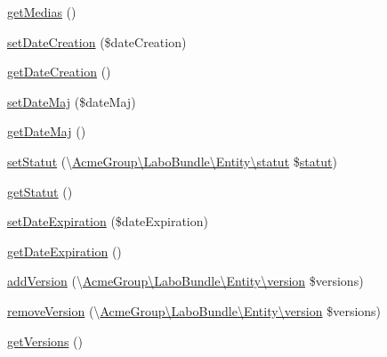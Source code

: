 \begin{DoxyCompactItemize}
\item 
\hyperlink{class_acme_group_1_1_labo_bundle_1_1_entity_1_1collection_aebb48b63b9f358f42f0a2e4c447462d7}{get\+Medias} ()
\item 
\hyperlink{class_acme_group_1_1_labo_bundle_1_1_entity_1_1collection_ab48594e6f659d97914667facb8b5699d}{set\+Date\+Creation} (\$date\+Creation)
\item 
\hyperlink{class_acme_group_1_1_labo_bundle_1_1_entity_1_1collection_acb915b587ac2facdadfbb069411717b9}{get\+Date\+Creation} ()
\item 
\hyperlink{class_acme_group_1_1_labo_bundle_1_1_entity_1_1collection_ac20823c14eb512e8e436012f3663f268}{set\+Date\+Maj} (\$date\+Maj)
\item 
\hyperlink{class_acme_group_1_1_labo_bundle_1_1_entity_1_1collection_aa575c965877e8fe9d65731ec74e68696}{get\+Date\+Maj} ()
\item 
\hyperlink{class_acme_group_1_1_labo_bundle_1_1_entity_1_1collection_ab8581e24e53759acb57fd59917f71a8a}{set\+Statut} (\textbackslash{}\hyperlink{class_acme_group_1_1_labo_bundle_1_1_entity_1_1statut}{Acme\+Group\textbackslash{}\+Labo\+Bundle\textbackslash{}\+Entity\textbackslash{}statut} \$\hyperlink{class_acme_group_1_1_labo_bundle_1_1_entity_1_1statut}{statut})
\item 
\hyperlink{class_acme_group_1_1_labo_bundle_1_1_entity_1_1collection_afb68fc90e3ba71bdb924adc38d3d77f9}{get\+Statut} ()
\item 
\hyperlink{class_acme_group_1_1_labo_bundle_1_1_entity_1_1collection_af2b03dc4f5f6bd409523057e38cc05bd}{set\+Date\+Expiration} (\$date\+Expiration)
\item 
\hyperlink{class_acme_group_1_1_labo_bundle_1_1_entity_1_1collection_aceb4f4208453fb1a521b1922501158cd}{get\+Date\+Expiration} ()
\item 
\hyperlink{class_acme_group_1_1_labo_bundle_1_1_entity_1_1collection_a63e8d8a2cb9c791b7cec2c6b9892bdc1}{add\+Version} (\textbackslash{}\hyperlink{class_acme_group_1_1_labo_bundle_1_1_entity_1_1version}{Acme\+Group\textbackslash{}\+Labo\+Bundle\textbackslash{}\+Entity\textbackslash{}version} \$versions)
\item 
\hyperlink{class_acme_group_1_1_labo_bundle_1_1_entity_1_1collection_ae9c538909deeb41bfd218f8df5668f6c}{remove\+Version} (\textbackslash{}\hyperlink{class_acme_group_1_1_labo_bundle_1_1_entity_1_1version}{Acme\+Group\textbackslash{}\+Labo\+Bundle\textbackslash{}\+Entity\textbackslash{}version} \$versions)
\item 
\hyperlink{class_acme_group_1_1_labo_bundle_1_1_entity_1_1collection_a74bb001467f7aa7af2418b2f42f0fe3a}{get\+Versions} ()

\end{DoxyCompactItemize}
